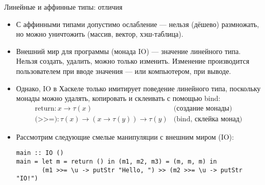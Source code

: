 \documentclass[aspectratio=169,dvipsnames,usenames]{beamer}
\begin{document}
\begin{frame}[fragile]{Линейные и аффинные типы: отличия}
\begin{itemize}
\item С аффинными типами допустимо ослабление --- нельзя (дёшево) размножать, но можно уничтожить
(массив, вектор, хэш-таблица).

\item Внешний мир для программы (монада IO) --- значение линейного типа.
Нельзя создать, удалить, можно только изменить.
Изменение производится пользователем при вводе значения --- или компьютером, при выводе.

\item Однако, IO в Хаскеле только имитирует поведение линейного типа, поскольку монады
можно удалять, копировать и склеивать с помощью bind:
$$\begin{array}{ll}\text{return}: x \rightarrow \tau(x) & \text{(создание монады)}\\
\texttt{(>{}>{}=)}: \tau(x) \rightarrow (x \rightarrow \tau(y)) \rightarrow \tau(y) & \text{(bind, склейка монад)}\end{array}$$

\item Рассмотрим следующие смелые манипуляции с внешним миром (IO):
\small\begin{verbatim}
main :: IO ()
main = let m = return () in (m1, m2, m3) = (m, m, m) in 
       (m1 >>= \u -> putStr "Hello, ") >> (m2 >>= \u -> putStr "IO!")
\end{verbatim}
\end{itemize}
\end{frame}
\end{document}
